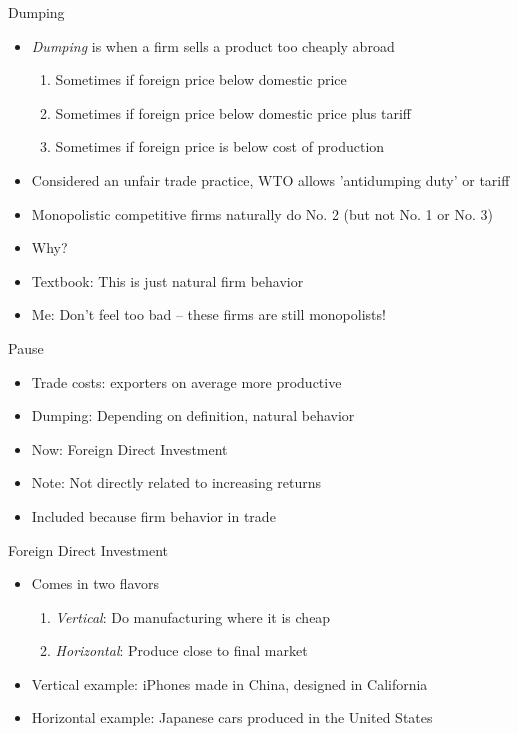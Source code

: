 \documentclass{beamer}
\begin{document}
\begin{frame}{Dumping}
    \begin{itemize}
        \item \emph{Dumping} is when a firm sells a product too cheaply abroad
        \begin{enumerate}
            \item Sometimes if foreign price below domestic price 
            \item Sometimes if foreign price below domestic price plus tariff
            \item Sometimes if foreign price is below cost of production
        \end{enumerate}
        \item Considered an unfair trade practice, WTO allows 'antidumping duty' or tariff
        \item Monopolistic competitive firms naturally do No. 2 (but not No. 1 or No. 3)
        \item Why?
        \item Textbook: This is just natural firm behavior 
        \item Me: Don't feel too bad -- these firms are still monopolists!
    \end{itemize}
\end{frame}

\begin{frame}{Pause}

    \begin{itemize}
        \item Trade costs: exporters on average more productive
        \item Dumping: Depending on definition, natural behavior
        \item Now: Foreign Direct Investment
        \item Note: Not directly related to increasing returns
        \item Included because firm behavior in trade
    \end{itemize}

\end{frame}

\begin{frame}{Foreign Direct Investment}

    \begin{itemize}
        \item Comes in two flavors
        \begin{enumerate}
            \item \emph{Vertical}: Do manufacturing where it is cheap
            \item \emph{Horizontal}: Produce close to final market
        \end{enumerate}
        \item Vertical example: iPhones made in China, designed in California
        \item Horizontal example: Japanese cars produced in the United States
    \end{itemize}

\end{frame}
\end{document}
